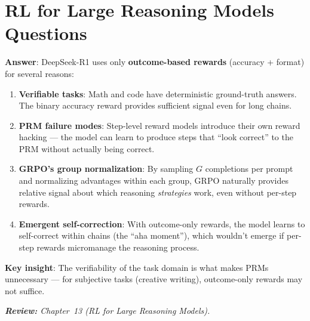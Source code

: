 \section{RL for Large Reasoning Models Questions}
\label{rl-for-large-reasoning-models-questions}

\begin{questionbox}
\textbf{Answer}: DeepSeek-R1 uses only \textbf{outcome-based rewards} (accuracy + format) for several reasons:

\begin{enumerate}
  \item \textbf{Verifiable tasks}: Math and code have deterministic ground-truth answers. The binary accuracy reward provides sufficient signal even for long chains.
  \item \textbf{PRM failure modes}: Step-level reward models introduce their own reward hacking --- the model can learn to produce steps that ``look correct'' to the PRM without actually being correct.
  \item \textbf{GRPO’s group normalization}: By sampling $G$ completions per prompt and normalizing advantages within each group, GRPO naturally provides relative signal about which reasoning \emph{strategies} work, even without per-step rewards.
  \item \textbf{Emergent self-correction}: With outcome-only rewards, the model learns to self-correct within chains (the ``aha moment''), which wouldn’t emerge if per-step rewards micromanage the reasoning process.
\end{enumerate}

\textbf{Key insight}: The verifiability of the task domain is what makes PRMs unnecessary --- for subjective tasks (creative writing), outcome-only rewards may not suffice.

\emph{\textbf{Review:} Chapter~13 (RL for Large Reasoning Models).}
\end{questionbox}

